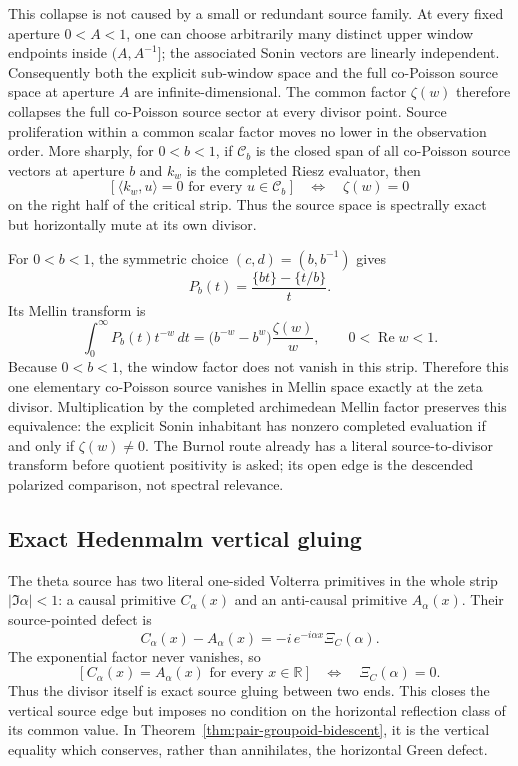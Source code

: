 \documentclass[11pt]{article}
\theoremstyle{definition}
\theoremstyle{remark}
\newcommand{\R}{\mathbb R}
\newcommand{\Rea}{\operatorname{Re}}
\begin{document}
This collapse is not caused by a small or redundant source family.  At every
fixed aperture \(0<A<1\), one can choose arbitrarily many distinct upper
window endpoints inside \((A,A^{-1}]\); the associated Sonin vectors are
linearly independent.  Consequently both the explicit sub-window space and
the full co-Poisson source space at aperture \(A\) are infinite-dimensional.
The common factor \(\zeta(w)\) therefore collapses the full co-Poisson source
sector at every divisor point.  Source proliferation within a common scalar
factor moves no lower in the observation order.
More sharply, for \(0<b<1\), if \(\mathcal C_b\) is the closed span of all
co-Poisson source vectors at aperture \(b\) and \(k_w\) is the completed
Riesz evaluator, then
\[
  \bigl[\ \langle k_w,u\rangle=0\text{ for every }u\in\mathcal C_b\ \bigr]
  \quad\Longleftrightarrow\quad \zeta(w)=0
\tag{5.8b0}\label{eq:burnol-full-span-orthogonality}
\]
on the right half of the critical strip.  Thus the source space is
spectrally exact but horizontally mute at its own divisor.

For \(0<b<1\), the symmetric choice
\((c,d)=(b,b^{-1})\) gives
\[
 P_b(t)=\frac{\{bt\}-\{t/b\}}{t}.
\tag{5.8c}\label{eq:burnol-fractional-source}
\]
Its Mellin transform is
\[
 \int_0^\infty P_b(t)t^{-w}\,dt
   =\bigl(b^{-w}-b^w\bigr)\frac{\zeta(w)}{w},
 \qquad 0<\Rea w<1.
\tag{5.8d}\label{eq:burnol-zeta-mellin}
\]
Because \(0<b<1\), the window factor does not vanish in this strip.
Therefore this one elementary co-Poisson source vanishes in Mellin space
exactly at the zeta divisor.  Multiplication by the completed archimedean
Mellin factor preserves this equivalence: the explicit Sonin inhabitant has
nonzero completed evaluation if and only if \(\zeta(w)\ne0\).  The Burnol route already has a literal
source-to-divisor transform before quotient positivity is asked; its open
edge is the descended polarized comparison, not spectral relevance.

\subsection{Exact Hedenmalm vertical gluing}

The theta source has two literal one-sided Volterra primitives in the whole
strip \(|\Im\alpha|<1\): a causal primitive \(C_\alpha(x)\) and an
anti-causal primitive \(A_\alpha(x)\).  Their source-pointed defect is
\[
 C_\alpha(x)-A_\alpha(x)
   =-i\,e^{-i\alpha x}\Xi_C(\alpha).
\tag{5.8d1}\label{eq:hedenmalm-two-ended-volterra-defect}
\]
The exponential factor never vanishes, so
\[
 \bigl[\ C_\alpha(x)=A_\alpha(x)\text{ for every }x\in\R\ \bigr]
 \quad\Longleftrightarrow\quad \Xi_C(\alpha)=0.
\tag{5.8d2}\label{eq:hedenmalm-volterra-coincidence}
\]
Thus the divisor itself is exact source gluing between two ends.  This
closes the vertical source edge but imposes no condition on the horizontal
reflection class of its common value.  In
Theorem~\ref{thm:pair-groupoid-bidescent}, it is the vertical equality which
conserves, rather than annihilates, the horizontal Green defect.
\end{document}
